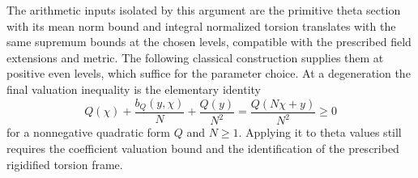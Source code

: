 The arithmetic inputs isolated by this argument are the primitive theta
section with its mean norm bound and integral normalized torsion
translates with the same supremum bounds at the chosen levels,
compatible with the prescribed field extensions and metric. The following
classical construction supplies them at positive even levels, which
suffice for the parameter choice.
At a degeneration the final valuation inequality is the elementary
identity
\[
 Q(\chi)+\frac{b_Q(y,\chi)}N+\frac{Q(y)}{N^2}
             =\frac{Q(N\chi+y)}{N^2}\ge0
\]
for a nonnegative quadratic form $Q$ and $N\ge1$. Applying it to
theta values still requires the coefficient valuation bound and the
identification of the prescribed rigidified torsion frame.
